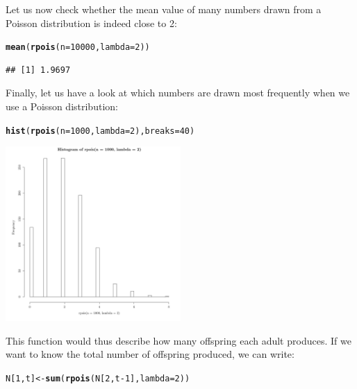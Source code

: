 \documentclass{article}\usepackage[]{graphicx}\usepackage[]{color}
\makeatletter
\newcommand{\hlnum}[1]{\textcolor[rgb]{0.686,0.059,0.569}{#1}}%
\newcommand{\hlopt}[1]{\textcolor[rgb]{0,0,0}{#1}}%
\newcommand{\hlstd}[1]{\textcolor[rgb]{0.345,0.345,0.345}{#1}}%
\newcommand{\hlkwb}[1]{\textcolor[rgb]{0.69,0.353,0.396}{#1}}%
\newcommand{\hlkwc}[1]{\textcolor[rgb]{0.333,0.667,0.333}{#1}}%
\newcommand{\hlkwd}[1]{\textcolor[rgb]{0.737,0.353,0.396}{\textbf{#1}}}%
\newenvironment{kframe}{%
 \def\at@end@of@kframe{}%
 \ifinner\ifhmode%
  \def\at@end@of@kframe{\end{minipage}}%
  \begin{minipage}{\columnwidth}%
 \fi\fi%
 \def\FrameCommand##1{\hskip\@totalleftmargin \hskip-\fboxsep
 \colorbox{shadecolor}{##1}\hskip-\fboxsep
     \hskip-\linewidth \hskip-\@totalleftmargin \hskip\columnwidth}%
 \MakeFramed {\advance\hsize-\width
   \@totalleftmargin\z@ \linewidth\hsize
   \@setminipage}}%
 {\par\unskip\endMakeFramed%
 \at@end@of@kframe}
\newenvironment{knitrout}{}{} %
\makeatother
\begin{document}
Let us now check whether the mean value of many numbers drawn from a Poisson distribution is indeed close to 2:
\begin{knitrout}
\color{fgcolor}\begin{kframe}
\begin{alltt}
\hlkwd{mean}\hlstd{(}\hlkwd{rpois}\hlstd{(}\hlkwc{n}\hlstd{=}\hlnum{10000}\hlstd{,}\hlkwc{lambda}\hlstd{=}\hlnum{2}\hlstd{))}
\end{alltt}
\begin{verbatim}
## [1] 1.9697
\end{verbatim}
\end{kframe}
\end{knitrout}
Finally, let us have a look at which numbers are drawn most frequently when we use a Poisson distribution:
\begin{knitrout}
\color{fgcolor}\begin{kframe}
\begin{alltt}
\hlkwd{hist}\hlstd{(}\hlkwd{rpois}\hlstd{(}\hlkwc{n}\hlstd{=}\hlnum{1000}\hlstd{,}\hlkwc{lambda}\hlstd{=}\hlnum{2}\hlstd{),}\hlkwc{breaks}\hlstd{=}\hlnum{40}\hlstd{)}
\end{alltt}
\end{kframe}

{\centering \includegraphics[width=0.5\textwidth]{figure/dice7-1} 

}



\end{knitrout}
This function would thus describe how many offspring each adult produces. If we want to know the total number of offspring produced, we can write:
\begin{knitrout}
\color{fgcolor}\begin{kframe}
\begin{alltt}
\hlstd{N[}\hlnum{1}\hlstd{,t]}\hlkwb{<-}\hlkwd{sum}\hlstd{(}\hlkwd{rpois}\hlstd{(N[}\hlnum{2}\hlstd{,t}\hlopt{-}\hlnum{1}\hlstd{],}\hlkwc{lambda}\hlstd{=}\hlnum{2}\hlstd{))}
\end{alltt}
\end{kframe}
\end{knitrout}
\end{document}
